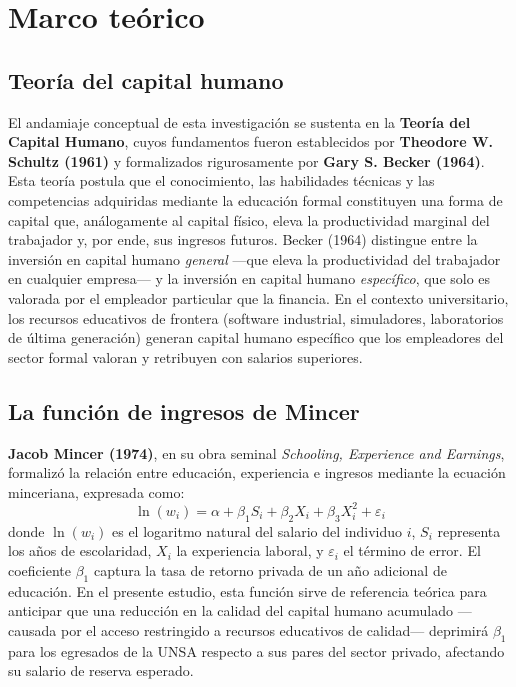 \documentclass[11pt, a4paper]{article}
\begin{document}
\section{Marco teórico}

\subsection{Teoría del capital humano}

El andamiaje conceptual de esta investigación se sustenta en la \textbf{Teoría del Capital Humano}, cuyos fundamentos fueron establecidos por \textbf{Theodore W. Schultz (1961)} y formalizados rigurosamente por \textbf{Gary S. Becker (1964)}. Esta teoría postula que el conocimiento, las habilidades técnicas y las competencias adquiridas mediante la educación formal constituyen una forma de capital que, análogamente al capital físico, eleva la productividad marginal del trabajador y, por ende, sus ingresos futuros. Becker (1964) distingue entre la inversión en capital humano \textit{general} —que eleva la productividad del trabajador en cualquier empresa— y la inversión en capital humano \textit{específico}, que solo es valorada por el empleador particular que la financia. En el contexto universitario, los recursos educativos de frontera (software industrial, simuladores, laboratorios de última generación) generan capital humano específico que los empleadores del sector formal valoran y retribuyen con salarios superiores.

\subsection{La función de ingresos de Mincer}

\textbf{Jacob Mincer (1974)}, en su obra seminal \textit{Schooling, Experience and Earnings}, formalizó la relación entre educación, experiencia e ingresos mediante la ecuación minceriana, expresada como:
\[
\ln(w_i) = \alpha + \beta_1 S_i + \beta_2 X_i + \beta_3 X_i^2 + \varepsilon_i
\]
donde $\ln(w_i)$ es el logaritmo natural del salario del individuo $i$, $S_i$ representa los años de escolaridad, $X_i$ la experiencia laboral, y $\varepsilon_i$ el término de error. El coeficiente $\beta_1$ captura la tasa de retorno privada de un año adicional de educación. En el presente estudio, esta función sirve de referencia teórica para anticipar que una reducción en la calidad del capital humano acumulado —causada por el acceso restringido a recursos educativos de calidad— deprimirá $\beta_1$ para los egresados de la UNSA respecto a sus pares del sector privado, afectando su salario de reserva esperado.
\end{document}
